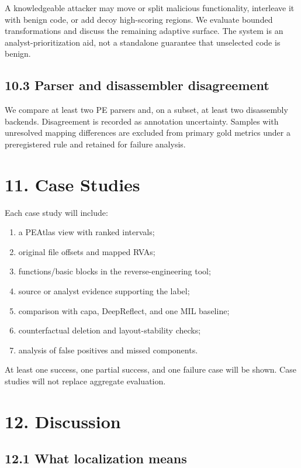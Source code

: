\documentclass[
  10pt,
]{article}
\providecommand{\tightlist}{%
  \setlength{\itemsep}{0pt}\setlength{\parskip}{0pt}}
\begin{document}
A knowledgeable attacker may move or split malicious functionality,
interleave it with benign code, or add decoy high-scoring regions. We
evaluate bounded transformations and discuss the remaining adaptive
surface. The system is an analyst-prioritization aid, not a standalone
guarantee that unselected code is benign.

\subsection{10.3 Parser and disassembler
disagreement}\label{parser-and-disassembler-disagreement}

We compare at least two PE parsers and, on a subset, at least two
disassembly backends. Disagreement is recorded as annotation
uncertainty. Samples with unresolved mapping differences are excluded
from primary gold metrics under a preregistered rule and retained for
failure analysis.

\section{11. Case Studies}\label{case-studies}

Each case study will include:

\begin{enumerate}
\def\labelenumi{\arabic{enumi}.}
\tightlist
\item
  a PEAtlas view with ranked intervals;
\item
  original file offsets and mapped RVAs;
\item
  functions/basic blocks in the reverse-engineering tool;
\item
  source or analyst evidence supporting the label;
\item
  comparison with capa, DeepReflect, and one MIL baseline;
\item
  counterfactual deletion and layout-stability checks;
\item
  analysis of false positives and missed components.
\end{enumerate}

At least one success, one partial success, and one failure case will be
shown. Case studies will not replace aggregate evaluation.

\section{12. Discussion}\label{discussion}

\subsection{12.1 What localization means}\label{what-localization-means}
\end{document}
